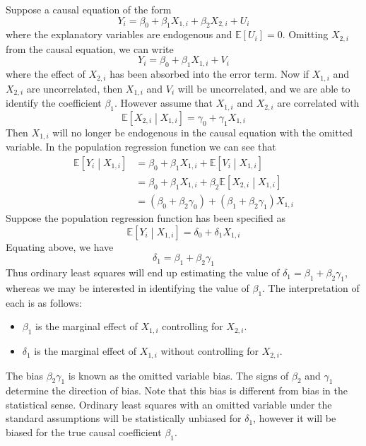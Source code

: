 \documentclass[11pt]{report} %
\begin{document}
Suppose a causal equation of the form
\begin{equation}
Y_{i} = \beta_{0} + \beta_{1}X_{1, i} + \beta_{2}X_{2, i} + U_{i}
\end{equation}
where the explanatory variables are endogenous and $\mathbb{E}\left[U_{i}\right] = 0$. Omitting $X_{2, i}$ from the causal equation, we can write
\begin{equation}
Y_{i} = \beta_{0} + \beta_{1}X_{1, i} + V_{i}
\end{equation}
where the effect of $X_{2, i}$ has been absorbed into the error term. Now if $X_{1, i}$ and $X_{2, i}$ are uncorrelated, then $X_{1, i}$ and $V_{i}$ will be uncorrelated, and we are able to identify the coefficient $\beta_{1}$. However assume that $X_{1, i}$ and $X_{2, i}$ are correlated with
\begin{equation}
\mathbb{E}\left[X_{2, i}\middle| X_{1, i}\right] = \gamma_{0} + \gamma_{1}X_{1, i}
\end{equation}
Then $X_{1, i}$ will no longer be endogenous in the causal equation with the omitted variable. In the population regression function we can see that
\begin{align}
\mathbb{E}\left[Y_{i}\middle| X_{1, i}\right] &= \beta_{0} + \beta_{1}X_{1, i} + \mathbb{E}\left[V_{i}\middle| X_{1, i}\right] \\
&= \beta_{0} + \beta_{1}X_{1, i} + \beta_{2}\mathbb{E}\left[X_{2, i}\middle| X_{1, i}\right] \\
&= \left(\beta_{0} + \beta_{2}\gamma_{0}\right) + \left(\beta_{1} + \beta_{2}\gamma_{1}\right)X_{1, i}
\end{align}
Suppose the population regression function has been specified as
\begin{equation}
\mathbb{E}\left[Y_{i}\middle| X_{1, i}\right] = \delta_{0} + \delta_{1}X_{1, i}
\end{equation}
Equating above, we have
\begin{equation}
\delta_{1} = \beta_{1} + \beta_{2}\gamma_{1}
\end{equation}
Thus ordinary least squares will end up estimating the value of $\delta_{1} = \beta_{1} + \beta_{2}\gamma_{1}$, whereas we may be interested in identifying the value of $\beta_{1}$. The interpretation of each is as follows:
\begin{itemize}
\item $\beta_{1}$ is the marginal effect of $X_{1, i}$ controlling for $X_{2, i}$.
\item $\delta_{1}$ is the marginal effect of $X_{1, i}$ without controlling for $X_{2, i}$.
\end{itemize}
The bias $\beta_{2}\gamma_{1}$ is known as the omitted variable bias. The signs of $\beta_{2}$ and $\gamma_{1}$ determine the direction of bias. Note that this bias is different from bias in the statistical sense. Ordinary least squares with an omitted variable under the standard assumptions will be statistically unbiased for $\delta_{1}$, however it will be biased for the true causal coefficient $\beta_{1}$.
\end{document}
